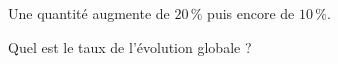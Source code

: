 
Une quantité augmente de $20\,\%$ puis encore de $10\,\%$.

Quel est le taux de l'évolution globale ?

\smallskip

